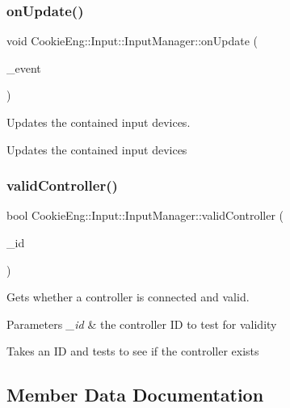 \subsubsection{\texorpdfstring{on\+Update()}{onUpdate()}}
{\footnotesize\ttfamily void Cookie\+Eng\+::\+Input\+::\+Input\+Manager\+::on\+Update (\begin{DoxyParamCaption}\item[{S\+D\+L\+\_\+\+Event \&}]{\+\_\+event }\end{DoxyParamCaption})}



Updates the contained input devices. 

Updates the contained input devices \mbox{\label{class_cookie_eng_1_1_input_1_1_input_manager_aec78aafcc64f05a3e4eb094e7bb690a6}} 
\subsubsection{\texorpdfstring{valid\+Controller()}{validController()}}
{\footnotesize\ttfamily bool Cookie\+Eng\+::\+Input\+::\+Input\+Manager\+::valid\+Controller (\begin{DoxyParamCaption}\item[{int}]{\+\_\+id }\end{DoxyParamCaption})\hspace{0.3cm}{\ttfamily [inline]}}



Gets whether a controller is connected and valid. 


\begin{DoxyParams}{Parameters}
{\em \+\_\+id} & the controller ID to test for validity\\
\hline
\end{DoxyParams}
Takes an ID and tests to see if the controller exists 

\subsection{Member Data Documentation}
\mbox{\label{class_cookie_eng_1_1_input_1_1_input_manager_ae0b4f61fc7337f58498b9d6eda637384}} 
